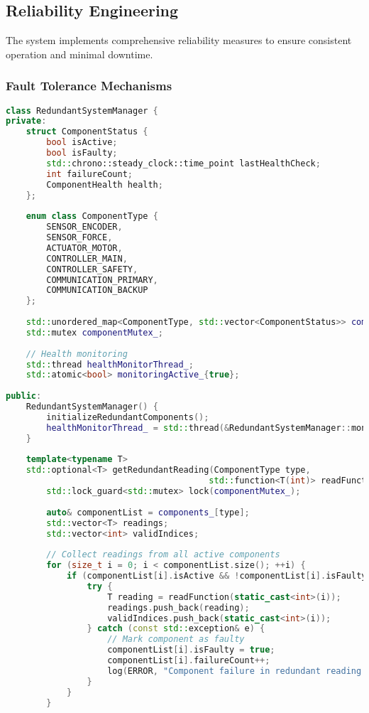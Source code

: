 \subsection{Reliability Engineering}
\label{subsec:reliability_engineering}

The system implements comprehensive reliability measures to ensure consistent operation and minimal downtime.

\subsubsection{Fault Tolerance Mechanisms}

\begin{lstlisting}[language=C++, caption=Redundant System Architecture]
class RedundantSystemManager {
private:
    struct ComponentStatus {
        bool isActive;
        bool isFaulty;
        std::chrono::steady_clock::time_point lastHealthCheck;
        int failureCount;
        ComponentHealth health;
    };
    
    enum class ComponentType {
        SENSOR_ENCODER,
        SENSOR_FORCE,
        ACTUATOR_MOTOR,
        CONTROLLER_MAIN,
        CONTROLLER_SAFETY,
        COMMUNICATION_PRIMARY,
        COMMUNICATION_BACKUP
    };
    
    std::unordered_map<ComponentType, std::vector<ComponentStatus>> components_;
    std::mutex componentMutex_;
    
    // Health monitoring
    std::thread healthMonitorThread_;
    std::atomic<bool> monitoringActive_{true};
    
public:
    RedundantSystemManager() {
        initializeRedundantComponents();
        healthMonitorThread_ = std::thread(&RedundantSystemManager::monitorHealth, this);
    }
    
    template<typename T>
    std::optional<T> getRedundantReading(ComponentType type,
                                        std::function<T(int)> readFunction) {
        std::lock_guard<std::mutex> lock(componentMutex_);
        
        auto& componentList = components_[type];
        std::vector<T> readings;
        std::vector<int> validIndices;
        
        // Collect readings from all active components
        for (size_t i = 0; i < componentList.size(); ++i) {
            if (componentList[i].isActive && !componentList[i].isFaulty) {
                try {
                    T reading = readFunction(static_cast<int>(i));
                    readings.push_back(reading);
                    validIndices.push_back(static_cast<int>(i));
                } catch (const std::exception& e) {
                    // Mark component as faulty
                    componentList[i].isFaulty = true;
                    componentList[i].failureCount++;
                    log(ERROR, "Component failure in redundant reading: " + std::string(e.what()));
                }
            }
        }
        

\end{lstlisting}
